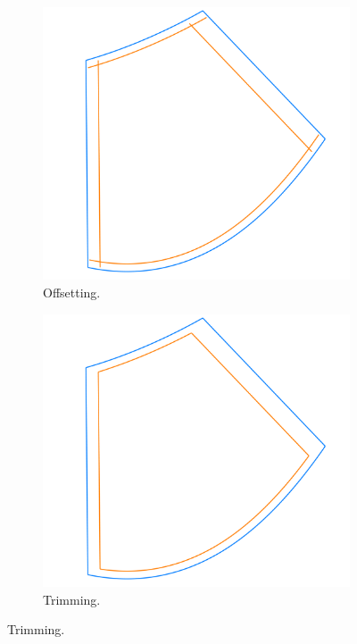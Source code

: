 \documentclass[a4paper, 11pt]{report}
\theoremstyle{definition}
\begin{document}
	\begin{figure}[H]
		\begin{subfigure}{.32\textwidth}
			\includegraphics[width=\textwidth]{../tec/chambers/81.png}
			\caption{Offsetting.}
		\end{subfigure}
		\begin{subfigure}{.32\textwidth}
			\includegraphics[width=\textwidth]{../tec/chambers/82.png}
			\caption{Trimming.}

\end{subfigure}
\end{figure}
\end{document}

